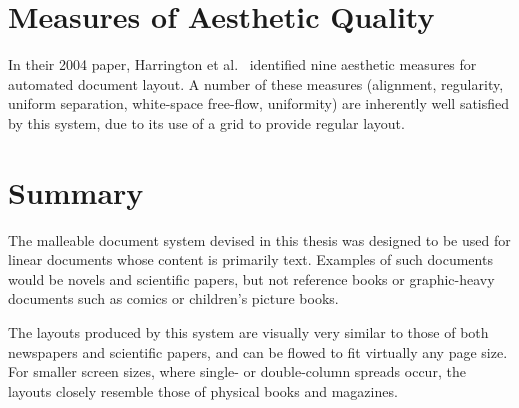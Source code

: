 \section{Measures of Aesthetic Quality}
In their 2004 paper, Harrington et al.~\cite{Harrington2004} identified nine aesthetic measures for automated document layout. A number of these measures (alignment, regularity, uniform separation, white-space free-flow, uniformity) are inherently well satisfied by this system, due to its use of a grid to provide regular layout. 





\section{Summary}
The malleable document system devised in this thesis was designed to be used for linear documents whose content is primarily text. Examples of such documents would be novels and scientific papers, but not reference books or graphic-heavy documents such as comics or children's picture books.

The layouts produced by this system are visually very similar to those of both newspapers and scientific papers, and can be flowed to fit virtually any page size. For smaller screen sizes, where single- or double-column spreads occur, the layouts closely resemble those of physical books and magazines.

